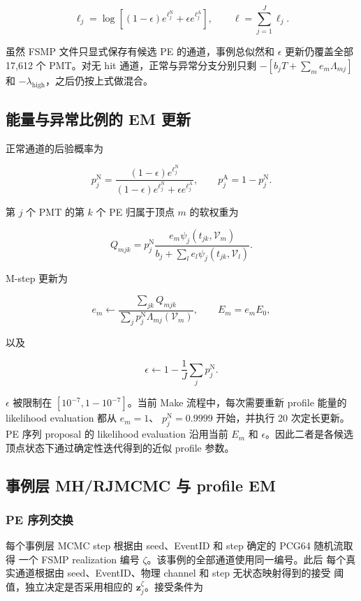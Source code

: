 \documentclass[UTF8,a4paper,11pt]{ctexart}
\begin{document}
\[
\ell_j
=\log\left[(1-\epsilon)e^{\ell_j^{\mathrm N}}
+\epsilon e^{\ell_j^{\mathrm A}}\right],
\qquad
\ell=\sum_{j=1}^{J}\ell_j.
\]

虽然 FSMP 文件只显式保存有候选 PE 的通道，事例总似然和 \(\epsilon\) 更新仍覆盖全部 17,612 个 PMT。对无 hit 通道，正常与异常分支分别只剩 \(-[b_jT+\sum_m e_m\Lambda_{mj}]\) 和 \(-\lambda_{\mathrm{high}}\)，之后仍按上式做混合。

\subsection{能量与异常比例的 EM 更新}

正常通道的后验概率为

\[
p_j^{\mathrm N}
=\frac{(1-\epsilon)e^{\ell_j^{\mathrm N}}}
{(1-\epsilon)e^{\ell_j^{\mathrm N}}+\epsilon e^{\ell_j^{\mathrm A}}},
\qquad
p_j^{\mathrm A}=1-p_j^{\mathrm N}.
\]

第 \(j\) 个 PMT 的第 \(k\) 个 PE 归属于顶点 \(m\) 的软权重为

\[
Q_{mjk}
=p_j^{\mathrm N}
\frac{e_m\psi_j(t_{jk},\mathcal V_m)}
{b_j+\sum_l e_l\psi_j(t_{jk},\mathcal V_l)}.
\]

M-step 更新为

\[
e_m\leftarrow
\frac{\sum_{jk}Q_{mjk}}
{\sum_jp_j^{\mathrm N}\Lambda_{mj}(\mathcal V_m)},
\qquad
E_m=e_mE_0,
\]

以及

\[
\epsilon\leftarrow
1-\frac{1}{J}\sum_jp_j^{\mathrm N}.
\]

\(\epsilon\) 被限制在 \([10^{-7},1-10^{-7}]\)。当前 Make 流程中，每次需要重新
profile 能量的 likelihood evaluation 都从 \(e_m=1\)、
\(p_j^{\mathrm N}=0.9999\) 开始，并执行 20 次定长更新。PE 序列 proposal 的
likelihood evaluation 沿用当前 \(E_m\) 和 \(\epsilon\)。因此二者是各候选
顶点状态下通过确定性迭代得到的近似 profile 参数。

\subsection{事例层 MH/RJMCMC 与 profile EM}

\subsubsection{PE 序列交换}

每个事例层 MCMC step 根据由 seed、EventID 和 step 确定的 PCG64 随机流取得
一个 FSMP realization 编号 \(\zeta\)。该事例的全部通道使用同一编号。此后
每个真实通道根据由 seed、EventID、物理 channel 和 step 无状态映射得到的接受
阈值，独立决定是否采用相应的 \(\mathbf z_j^\zeta\)。接受条件为
\end{document}
